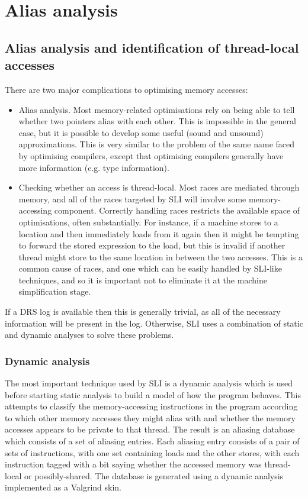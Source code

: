\documentclass[12pt,a4paper]{book}
\begin{document}
\section{Alias analysis}
\subsection{Alias analysis and identification of thread-local accesses}
There are two major complications to optimising memory accesses:

\begin{itemize}
\item
  Alias analysis.
  Most memory-related optimisations rely on being able to tell whether two pointers alias with each other.
  This is impossible in the general case, but it is possible to develop some useful (sound and unsound) approximations.
  This is very similar to the problem of the same name faced by optimising compilers, except that optimising compilers generally have more information (e.g. type information).
\item
  Checking whether an access is thread-local.
  Most races are mediated through memory, and all of the races targeted by SLI will involve some memory-accessing component.
  Correctly handling races restricts the available space of optimisations, often substantially.
  For instance, if a machine stores to a location and then immediately loads from it again then it might be tempting to forward the stored expression to the load, but this is invalid if another thread might store to the same location in between the two accesses.
  This is a common cause of races, and one which can be easily handled by SLI-like techniques, and so it is important not to eliminate it at the machine simplification stage.
\end{itemize}

If a DRS log is available then this is generally trivial, as all of the necessary information will be present in the log.
Otherwise, SLI uses a combination of static and dynamic analyses to solve these problems.

\subsubsection{Dynamic analysis}

The most important technique used by SLI is a dynamic analysis which is used before starting static analysis to build a model of how the program behaves.
This attempts to classify the memory-accessing instructions in the program according to which other memory accesses they might alias with and whether the memory accesses appears to be private to that thread.
The result is an aliasing database which consists of a set of aliasing entries.
Each aliasing entry consists of a pair of sets of instructions, with one set containing loads and the other stores, with each instruction tagged with a bit saying whether the accessed memory was thread-local or possibly-shared.
The database is generated using a dynamic analysis implemented as a Valgrind skin.
\end{document}
